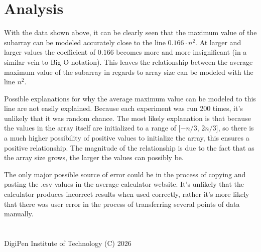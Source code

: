 \documentclass {article}
\begin{document}

\section{Analysis}
\indent \par With the data shown above, it can be clearly seen that the maximum value of the subarray can be modeled accurately close to the line $0.166 \cdot n^2$. At larger and larger values the coefficient of $0.166$ becomes more and more insignificant (in a similar vein to Big-O notation). This leaves the relationship between the average maximum value of the subarray in regards to array size can be modeled with the line $n^2$. 
\indent \par Possible explanations for why the average maximum value can be modeled to this line are not easily explained. Because each experiment was run 200 times, it's unlikely that it was random chance. The most likely explanation is that because the values in the array itself are initialized to a range of [$-n/3$, $2n/3$], so there is a much higher possibility of positive values to initialize the array, this ensures a positive relationship. The magnitude of the relationship is due to the fact that as the array size grows, the larger the values can possibly be.
\indent \par The only major possible source of error could be in the process of copying and pasting the .csv values in the average calculator website. It's unlikely that the calculator produces incorrect results when used correctly, rather it's more likely that there was user error in the process of transferring several points of data manually. 

\section*{} 
DigiPen Institute of Technology (C) 2026
\end{document}

